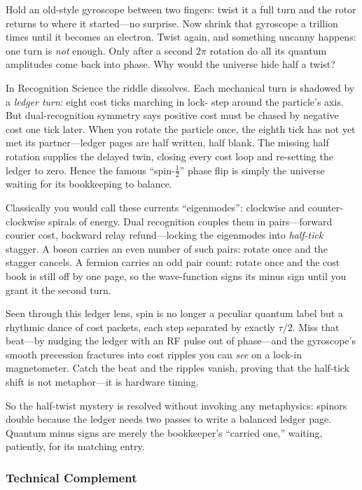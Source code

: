 \documentclass[11pt,oneside]{book}
\begin{document}
Hold an old-style gyroscope between two fingers: twist it a full turn
and the rotor returns to where it started—no surprise.  
Now shrink that gyroscope a trillion times until it becomes an
electron.  Twist again, and something uncanny happens: one turn is
\emph{not} enough.  Only after a second $2\pi$ rotation do all its
quantum amplitudes come back into phase.  Why would the universe hide
half a twist?

In Recognition Science the riddle dissolves.  Each mechanical turn is
shadowed by a \emph{ledger turn}: eight cost ticks marching in lock-
step around the particle’s axis.  But dual-recognition symmetry says
positive cost must be chased by negative cost one tick later.
When you rotate the particle once, the eighth tick has not yet met its
partner—ledger pages are half written, half blank.  The missing half
rotation supplies the delayed twin, closing every cost loop and
re-setting the ledger to zero.  Hence the famous “spin-\(\tfrac12\)”
phase flip is simply the universe waiting for its bookkeeping to
balance.

Classically you would call these currents “eigenmodes”: clockwise and
counter-clockwise spirals of energy.  Dual recognition couples them in
pairs—forward courier cost, backward relay refund—locking the
eigenmodes into \emph{half-tick} stagger.  A boson carries an even
number of such pairs: rotate once and the stagger cancels.  A fermion
carries an odd pair count: rotate once and the cost book is still off
by one page, so the wave-function signs its minus sign until you grant
it the second turn.

Seen through this ledger lens, spin is no longer a peculiar quantum
label but a rhythmic dance of cost packets, each step separated by
exactly \(\tau/2\).  Miss that beat—by nudging the ledger with an RF
pulse out of phase—and the gyroscope’s smooth precession fractures
into cost ripples you can \emph{see} on a lock-in magnetometer.  Catch
the beat and the ripples vanish, proving that the half-tick shift is
not metaphor—it is hardware timing.

So the half-twist mystery is resolved without invoking any
metaphysics: spinors double because the ledger needs two passes to
write a balanced ledger page.  Quantum minus signs are merely the
bookkeeper’s “carried one,” waiting, patiently, for its matching
entry.


\subsubsection*{Technical Complement}
\end{document}
